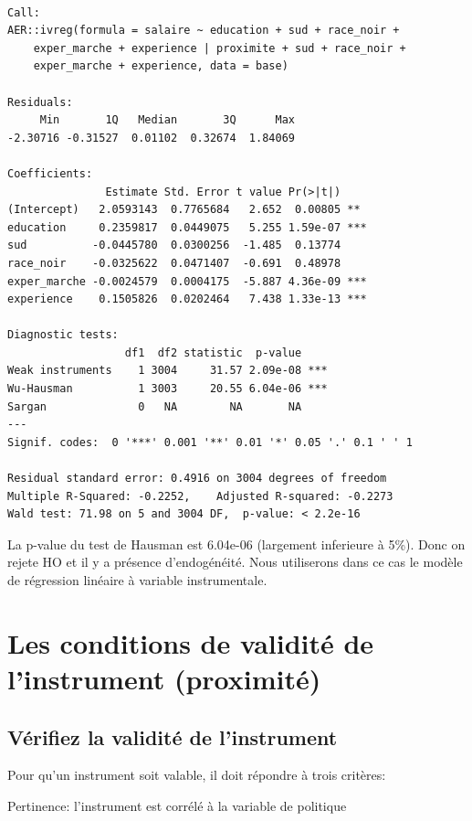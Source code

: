 \documentclass[
  letterpaper,
  DIV=11,
  numbers=noendperiod]{scrartcl}
\begin{document}
\begin{verbatim}

Call:
AER::ivreg(formula = salaire ~ education + sud + race_noir + 
    exper_marche + experience | proximite + sud + race_noir + 
    exper_marche + experience, data = base)

Residuals:
     Min       1Q   Median       3Q      Max 
-2.30716 -0.31527  0.01102  0.32674  1.84069 

Coefficients:
               Estimate Std. Error t value Pr(>|t|)    
(Intercept)   2.0593143  0.7765684   2.652  0.00805 ** 
education     0.2359817  0.0449075   5.255 1.59e-07 ***
sud          -0.0445780  0.0300256  -1.485  0.13774    
race_noir    -0.0325622  0.0471407  -0.691  0.48978    
exper_marche -0.0024579  0.0004175  -5.887 4.36e-09 ***
experience    0.1505826  0.0202464   7.438 1.33e-13 ***

Diagnostic tests:
                  df1  df2 statistic  p-value    
Weak instruments    1 3004     31.57 2.09e-08 ***
Wu-Hausman          1 3003     20.55 6.04e-06 ***
Sargan              0   NA        NA       NA    
---
Signif. codes:  0 '***' 0.001 '**' 0.01 '*' 0.05 '.' 0.1 ' ' 1

Residual standard error: 0.4916 on 3004 degrees of freedom
Multiple R-Squared: -0.2252,    Adjusted R-squared: -0.2273 
Wald test: 71.98 on 5 and 3004 DF,  p-value: < 2.2e-16 
\end{verbatim}

La p-value du test de Hausman est 6.04e-06 (largement inferieure à 5\%).
Donc on rejete HO et il y a présence d'endogénéité. Nous utiliserons
dans ce cas le modèle de régression linéaire à variable instrumentale.

\section{Les conditions de validité de l'instrument
(proximité)}\label{les-conditions-de-validituxe9-de-linstrument-proximituxe9}

\subsection{Vérifiez la validité de
l'instrument}\label{vuxe9rifiez-la-validituxe9-de-linstrument}

Pour qu'un instrument soit valable, il doit répondre à trois critères:

Pertinence: l'instrument est corrélé à la variable de politique
\end{document}
